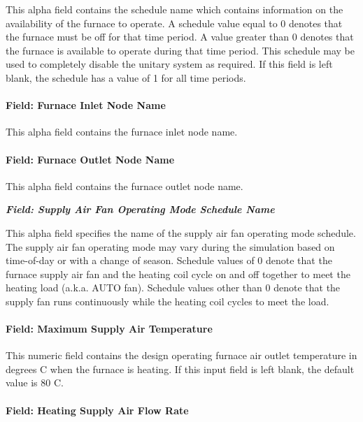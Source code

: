 This alpha field contains the schedule name which contains information on the availability of the furnace to operate. A schedule value equal to 0 denotes that the furnace must be off for that time period. A value greater than 0 denotes that the furnace is available to operate during that time period. This schedule may be used to completely disable the unitary system as required. If this field is left blank, the schedule has a value of 1 for all time periods.

\paragraph{Field: Furnace Inlet Node Name}\label{field-furnace-inlet-node-name}

This alpha field contains the furnace inlet node name.

\paragraph{Field: Furnace Outlet Node Name}\label{field-furnace-outlet-node-name}

This alpha field contains the furnace outlet node name.

\textbf{\emph{Field: Supply Air Fan Operating Mode Schedule Name}}

This alpha field specifies the name of the supply air fan operating mode schedule. The supply air fan operating mode may vary during the simulation based on time-of-day or with a change of season. Schedule values of 0 denote that the furnace supply air fan and the heating coil cycle on and off together to meet the heating load (a.k.a. AUTO fan). Schedule values other than 0 denote that the supply fan runs continuously while the heating coil cycles to meet the load.

\paragraph{Field: Maximum Supply Air Temperature}\label{field-maximum-supply-air-temperature-3}

This numeric field contains the design operating furnace air outlet temperature in degrees C when the furnace is heating. If this input field is left blank, the default value is 80 C.

\paragraph{Field: Heating Supply Air Flow Rate}\label{field-heating-supply-air-flow-rate-4-000}

